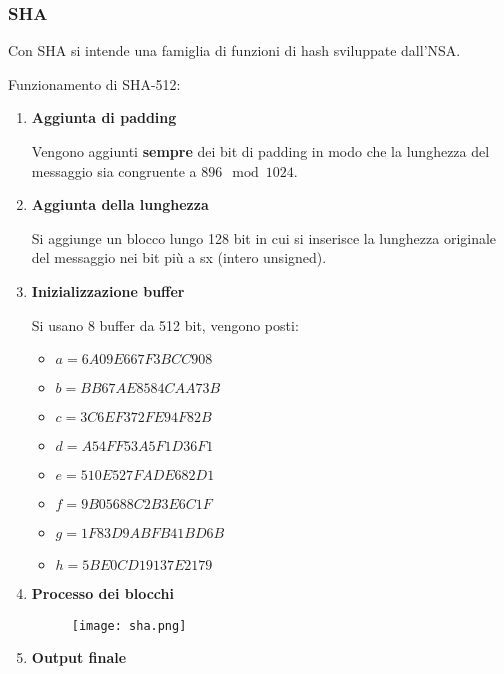 \documentclass{article}
\begin{document}
\subsubsection{SHA}

Con SHA si intende una famiglia di funzioni di hash sviluppate dall'NSA.\newline

\noindent Funzionamento di SHA-512:
\begin{enumerate}
    \item \textbf{Aggiunta di padding}

        Vengono aggiunti \textbf{sempre} dei bit di padding in modo che la lunghezza del messaggio sia congruente a $896\mod1024$.

    \item \textbf{Aggiunta della lunghezza}

        Si aggiunge un blocco lungo 128 bit in cui si inserisce la lunghezza originale del messaggio nei bit più a sx (intero unsigned).

    \item \textbf{Inizializzazione buffer}

        Si usano 8 buffer da 512 bit, vengono posti: 

        \begin{multicols}{2}
        \begin{itemize}
            \item $ a = 6A09E667F3BCC908$
            \item $ b = BB67AE8584CAA73B$
            \item $ c = 3C6EF372FE94F82B$
            \item $ d = A54FF53A5F1D36F1$
            \item $ e = 510E527FADE682D1$
            \item $ f = 9B05688C2B3E6C1F$
            \item $ g = 1F83D9ABFB41BD6B$
            \item $ h = 5BE0CD19137E2179$
        \end{itemize}
        \end{multicols}

    \item \textbf{Processo dei blocchi}

        \begin{figure}[ht]
            \centering
            \texttt{[image: sha.png]}
        \end{figure}

    \item \textbf{Output finale}
    
\end{enumerate}
\end{document}

